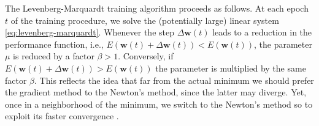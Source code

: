 \documentclass[12pt, a4paper, twoside, openright]{report}
\numberwithin{equation}{chapter}
\theoremstyle{theorem}
\theoremstyle{definition}
\theoremstyle{remark}
\theoremstyle{proposition}
\numberwithin{figure}{chapter}
\begin{document}
		The Levenberg-Marquardt training algorithm proceeds as follows. At each epoch $t$ of the training procedure, we solve the (potentially large) linear system \eqref{eq:levenberg-marquardt}. Whenever the step $\Delta \boldsymbol{w}(t)$ leads to a reduction in the performance function, i.e., $E(\boldsymbol{w}(t) + \Delta \boldsymbol{w}(t)) < E(\boldsymbol{w}(t))$, the parameter $\mu$ is reduced by a factor $\beta > 1$. Conversely, if $E(\boldsymbol{w}(t) + \Delta \boldsymbol{w}(t)) > E(\boldsymbol{w}(t))$ the parameter is multiplied by the same factor $\beta$. This reflects the idea that far from the actual minimum we should prefer the gradient method to the Newton's method, since the latter may diverge. Yet, once in a neighborhood of the minimum, we switch to the Newton's method so to exploit its faster convergence \cite{Mar63}.
		
\end{document}
